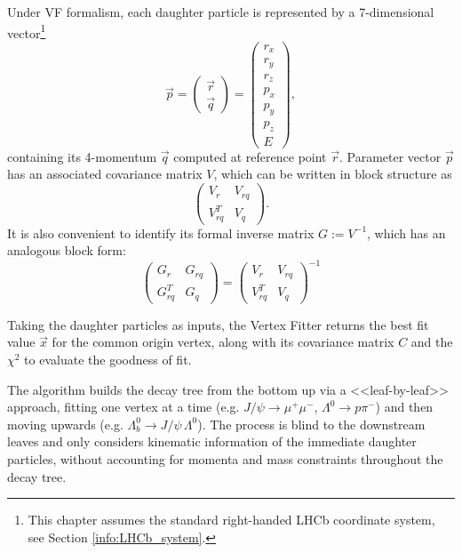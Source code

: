 Under VF formalism, each daughter particle is represented by a 7-dimensional vector\footnote{This chapter assumes the standard right-handed LHCb coordinate system, see Section \ref{info:LHCb_system}.}
\begin{equation}
	\vec{p} = \begin{pmatrix}
		\vec{r} \\ \vec{q}
	\end{pmatrix}
	=
	\begin{pmatrix}
		r_x \\ r_y \\ r_z \\ p_x \\ p_y \\ p_z \\ E
	\end{pmatrix},
	\label{eq:particle_representation}
\end{equation}
containing its 4-momentum $\vec{q}$ computed at reference point $\vec{r}$.
Parameter vector $\vec{p}$ has an associated covariance matrix $V$, which can be written in block structure as
\begin{equation}
	\begin{pmatrix}
		V_r      & V_{rq} \\
		V_{rq}^T & V_q
	\end{pmatrix}.
	\label{eq:par_covmatrix}
\end{equation}
It is also convenient to identify its formal inverse matrix $G := V^{-1}$, which has an analogous block form:
\begin{equation}
	\begin{pmatrix}
		G_r      & G_{rq} \\
		G_{rq}^T & G_q
	\end{pmatrix}
	=
	\begin{pmatrix}
		V_r      & V_{rq} \\
		V_{rq}^T & V_q
	\end{pmatrix}^{-1}
\end{equation}

Taking the daughter particles as inputs, the Vertex Fitter returns the best fit value $\vec{x}$ for the common origin vertex, along with its covariance matrix $C$ and the $\chi^2$ to evaluate the goodness of fit.

The algorithm builds the decay tree from the bottom up via a <<leaf-by-leaf>> approach, fitting one vertex at a time (e.g. $J/\psi \rightarrow \mu^+ \mu^-$, $\Lambda^0 \rightarrow p \pi^-$) and then moving upwards (e.g. $\Lambda_b^0 \rightarrow J/\psi\,\Lambda^0$).
The process is blind to the downstream leaves and only considers kinematic information of the immediate daughter particles, without accounting for momenta and mass constraints throughout the decay tree.

